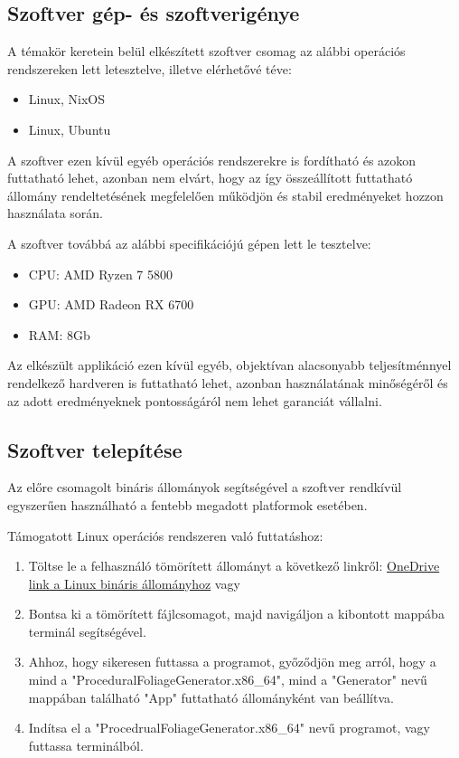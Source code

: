 \subsection{Szoftver gép- és szoftverigénye}

A témakör keretein belül elkészített szoftver csomag az alábbi operációs rendszereken lett letesztelve, illetve elérhetővé téve:
\begin{itemize}
    \itemsep0em
    \item Linux, NixOS
    \item Linux, Ubuntu
\end{itemize}

A szoftver ezen kívül egyéb operációs rendszerekre is fordítható és azokon futtatható lehet, azonban nem elvárt, hogy az így összeállított futtatható állomány rendeltetésének megfelelően működjön és stabil eredményeket hozzon használata során.

A szoftver továbbá az alábbi specifikációjú gépen lett le tesztelve:

\begin{itemize}
    \itemsep0em
    \item CPU: AMD Ryzen 7 5800
    \item GPU: AMD Radeon RX 6700
    \item RAM: 8Gb 
\end{itemize}

Az elkészült applikáció ezen kívül egyéb, objektívan alacsonyabb teljesítménnyel rendelkező hardveren is futtatható lehet, azonban használatának minőségéről és az adott eredményeknek pontosságáról nem lehet garanciát vállalni. 

\subsection{Szoftver telepítése}
Az előre csomagolt bináris állományok segítségével a szoftver rendkívül egyszerűen használható a fentebb megadott platformok esetében.

Támogatott Linux operációs rendszeren való futtatáshoz:
\begin{enumerate}
    \itemsep0em

    \item\label{step:first} Töltse le a felhasználó  tömörített állományt a következő linkről: \href{https://ikelte-my.sharepoint.com/:u:/g/personal/aqij3g_inf_elte_hu/IQAKX4wdjd_TRq4KHYV9FE2-AYfOyQIMprDvK9gwU997Bro?e=OyAabH}{OneDrive link a Linux bináris állományhoz} vagy  
    \item Bontsa ki a tömörített fájlcsomagot, majd navigáljon a kibontott mappába terminál segítségével.
    \item Ahhoz, hogy sikeresen futtassa a programot, győződjön meg arról, hogy a mind a "ProceduralFoliageGenerator.x86_64", mind a "Generator" nevű mappában található "App" futtatható állományként van beállítva.
    \item Indítsa el a "ProcedrualFoliageGenerator.x86_64" nevű programot, vagy futtassa terminálból.
\end{enumerate}

